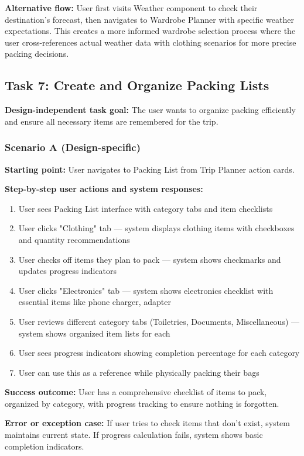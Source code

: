 \documentclass[11pt,a4paper]{article}
\begin{document}
\textbf{Alternative flow:} User first visits Weather component to check their destination's forecast, then navigates to Wardrobe Planner with specific weather expectations. This creates a more informed wardrobe selection process where the user cross-references actual weather data with clothing scenarios for more precise packing decisions.

\subsection*{Task 7: Create and Organize Packing Lists}

\textbf{Design-independent task goal:}
The user wants to organize packing efficiently and ensure all necessary items are remembered for the trip.

\subsubsection*{Scenario A (Design-specific)}

\textbf{Starting point:} User navigates to Packing List from Trip Planner action cards.

\textbf{Step-by-step user actions and system responses:}
\begin{enumerate}
\item User sees Packing List interface with category tabs and item checklists
\item User clicks "Clothing" tab — system displays clothing items with checkboxes and quantity recommendations
\item User checks off items they plan to pack — system shows checkmarks and updates progress indicators
\item User clicks "Electronics" tab — system shows electronics checklist with essential items like phone charger, adapter
\item User reviews different category tabs (Toiletries, Documents, Miscellaneous) — system shows organized item lists for each
\item User sees progress indicators showing completion percentage for each category
\item User can use this as a reference while physically packing their bags
\end{enumerate}

\textbf{Success outcome:} User has a comprehensive checklist of items to pack, organized by category, with progress tracking to ensure nothing is forgotten.

\textbf{Error or exception case:} If user tries to check items that don't exist, system maintains current state. If progress calculation fails, system shows basic completion indicators.
\end{document}
